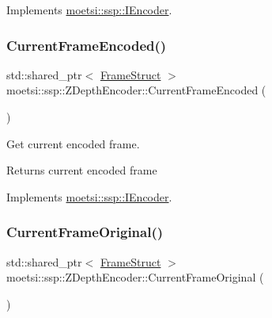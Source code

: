 Implements \hyperlink{classmoetsi_1_1ssp_1_1IEncoder_a8c223ec82fdd30ee8ee75157306054ec}{moetsi\+::ssp\+::\+I\+Encoder}.

\mbox{\label{classmoetsi_1_1ssp_1_1ZDepthEncoder_a075752f62bbc40f71026812c5548ef5f}} 
\subsubsection{\texorpdfstring{Current\+Frame\+Encoded()}{CurrentFrameEncoded()}}
{\footnotesize\ttfamily std\+::shared\+\_\+ptr$<$ \hyperlink{structmoetsi_1_1ssp_1_1FrameStruct}{Frame\+Struct} $>$ moetsi\+::ssp\+::\+Z\+Depth\+Encoder\+::\+Current\+Frame\+Encoded (\begin{DoxyParamCaption}{ }\end{DoxyParamCaption})\hspace{0.3cm}{\ttfamily [virtual]}}



Get current encoded frame. 

\begin{DoxyReturn}{Returns}
current encoded frame 
\end{DoxyReturn}


Implements \hyperlink{classmoetsi_1_1ssp_1_1IEncoder_a178d117518e7c7007414ea9c82bd3ed6}{moetsi\+::ssp\+::\+I\+Encoder}.

\mbox{\label{classmoetsi_1_1ssp_1_1ZDepthEncoder_abe5820ee0dea5fec22e398a7ba4d6777}} 
\subsubsection{\texorpdfstring{Current\+Frame\+Original()}{CurrentFrameOriginal()}}
{\footnotesize\ttfamily std\+::shared\+\_\+ptr$<$ \hyperlink{structmoetsi_1_1ssp_1_1FrameStruct}{Frame\+Struct} $>$ moetsi\+::ssp\+::\+Z\+Depth\+Encoder\+::\+Current\+Frame\+Original (\begin{DoxyParamCaption}{ }\end{DoxyParamCaption})\hspace{0.3cm}{\ttfamily [virtual]}}




